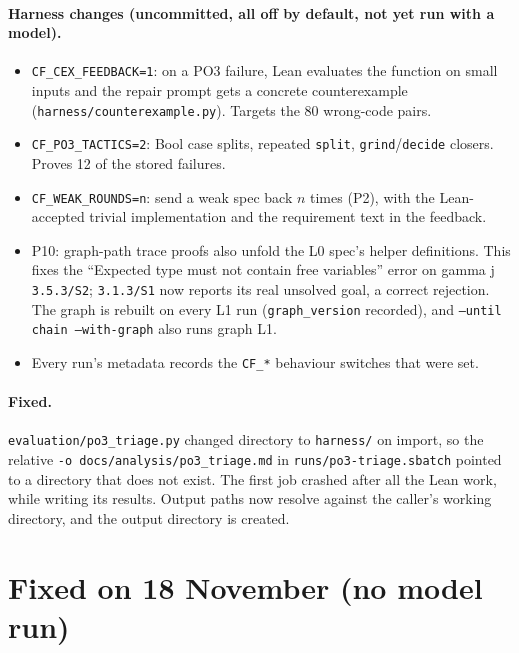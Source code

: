 \documentclass[11pt,a4paper]{article}
\newcommand{\code}[1]{\texttt{#1}}
\newcommand{\file}[1]{\texttt{#1}}
\begin{document}
\paragraph{Harness changes (uncommitted, all off by default, not yet run with a model).}
\begin{itemize}
  \item \code{CF\_CEX\_FEEDBACK=1}: on a PO3 failure, Lean evaluates the function on small inputs and
        the repair prompt gets a concrete counterexample (\file{harness/counterexample.py}). Targets the 80
        wrong-code pairs.
  \item \code{CF\_PO3\_TACTICS=2}: Bool case splits, repeated \code{split}, \code{grind}/\code{decide}
        closers. Proves 12 of the stored failures.
  \item \code{CF\_WEAK\_ROUNDS=n}: send a weak spec back $n$ times (P2), with the Lean-accepted trivial
        implementation and the requirement text in the feedback.
  \item P10: graph-path trace proofs also unfold the L0 spec's helper definitions. This fixes the
        ``Expected type must not contain free variables'' error on gamma j \code{3.5.3/S2}; \code{3.1.3/S1}
        now reports its real unsolved goal, a correct rejection. The graph is rebuilt on every L1 run
        (\code{graph\_version} recorded), and \code{--until chain --with-graph} also runs graph L1.
  \item Every run's metadata records the \code{CF\_*} behaviour switches that were set.
\end{itemize}

\paragraph{Fixed.} \file{evaluation/po3\_triage.py} changed directory to \file{harness/} on import, so
the relative \code{-o docs/analysis/po3\_triage.md} in \file{runs/po3-triage.sbatch} pointed to a
directory that does not exist. The first job crashed after all the Lean work, while writing its
results. Output paths now resolve against the caller's working directory, and the output directory is
created.

\section{Fixed on 18 November (no model run)}
\end{document}

